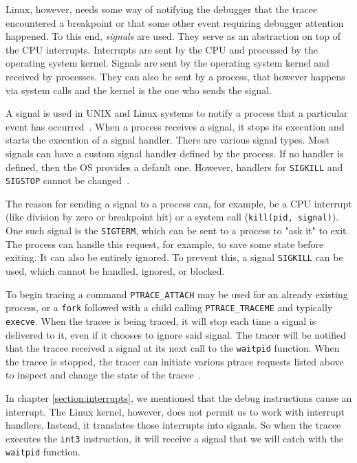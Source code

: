 Linux, however, needs some way of notifying the debugger that the tracee
encountered a breakpoint or that some other event requiring debugger attention
happened. To this end, \textit{signals} are used. They serve as an abstraction
on top of the CPU interrupts. Interrupts are sent by the CPU and processed by
the operating system kernel. Signals are sent by the operating system kernel
and received by processes. They can also be sent by a process, that however
happens via system calls and the kernel is the one who sends the signal.

A signal is used in UNIX and Linux systems to notify a process that a
particular event has occurred~\cite{os-concepts}. When a process receives a
signal, it stops its execution and starts the execution of a signal handler.
There are various signal types. Most signals can have a custom signal handler
defined by the process. If no handler is defined, then the OS provides a
default one. However, handlers for \texttt{SIGKILL} and \texttt{SIGSTOP} cannot
be changed~\cite{signals}.

The reason for sending a signal to a process can, for example, be a CPU
interrupt (like division by zero or breakpoint hit) or a system call
(\texttt{kill(pid, signal)}). One such signal is the \texttt{SIGTERM}, which
can be sent to a process to "ask it" to exit. The process can handle this
request, for example, to save some state before exiting. It can also be
entirely ignored. To prevent this, a signal \texttt{SIGKILL} can be used, which
cannot be handled, ignored, or blocked.

To begin tracing a command \texttt{PTRACE\_ATTACH} may be used for an already
existing process, or a \texttt{fork} followed with a child calling
\texttt{PTRACE\_TRACEME} and typically \texttt{execve}. When the tracee is
being traced, it will stop each time a signal is delivered to it, even if it
chooses to ignore said signal. The tracer will be notified that the tracee
received a signal at its next call to the \texttt{waitpid} function. When the
tracee is stopped, the tracer can initiate various ptrace requests listed above
to inspect and change the state of the tracee~\cite{ptrace}.

In chapter \ref{section:interrupts}, we mentioned that the debug instructions
cause an interrupt. The Linux kernel, however, does not permit us to work with
interrupt handlers. Instead, it translates those interrupts into signals. So
when the tracee executes the \texttt{int3} instruction, it will receive a
signal that we will catch with the \texttt{waitpid} function.

